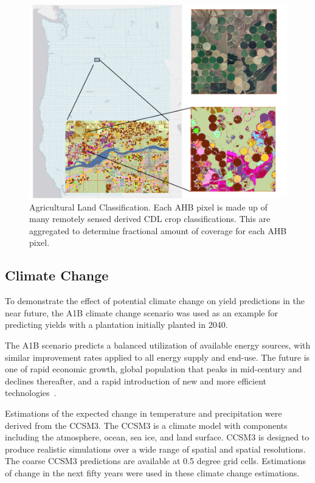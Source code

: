 \documentclass[preprint,12pt]{elsarticle}
\begin{document}
\begin{figure}[hp]
  \centering
  \includegraphics[width=1\linewidth]{land.png}
  \caption{Agricultural Land Classification.  Each \ac{AHB} pixel is made up of
    many remotely sensed derived \ac{CDL} crop classifications.  This
    are aggregated to determine fractional amount of coverage for each
    \ac{AHB} pixel. }
  \label{fig:land}
\end{figure}

\subsection{Climate Change}
\label{sec:climate}

To demonstrate the effect of potential climate change on yield
predictions in the near future, the A1B climate change scenario was
used as an example for predicting yields with a plantation initially
planted in 2040.

The A1B scenario predicts a balanced utilization of available energy
sources, with similar improvement rates applied to all energy supply
and end-use.  The future is one of rapid economic growth, global
population that peaks in mid-century and declines thereafter, and a
rapid introduction of new and more efficient
technologies~\cite{IPCC2007,Parry2007}.

Estimations of the expected change in temperature and precipitation
were derived from the \ac{CCSM3}.  The \ac{CCSM3} is a climate model
with components including the atmosphere, ocean, sea ice, and land
surface. \ac{CCSM3} is designed to produce realistic simulations over
a wide range of spatial and spatial resolutions.  The coarse
\ac{CCSM3} predictions are available at 0.5 degree grid cells.
Estimations of change in the next fifty years were used in these
climate change estimations.
\end{document}
